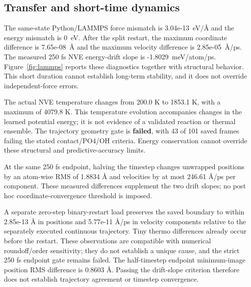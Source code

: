 \subsection{Transfer and short-time dynamics}

The same-state Python/LAMMPS force mismatch is 3.04e-13~eV/\AA{} and the energy mismatch is 0~eV. After the split restart, the maximum coordinate difference is 7.65e-08~\AA{} and the maximum velocity difference is 2.85e-05~\AA{}/ps. The measured 250 fs NVE energy-drift slope is -1.8029~meV/atom/ps. Figure~\ref{fig:lammps} reports these diagnostics together with structural behavior. This short duration cannot establish long-term stability, and it does not override independent-force errors.

The actual NVE temperature changes from 200.0 K to 1853.1 K, with a maximum of 4079.8 K. This temperature evolution accompanies changes in the learned potential energy; it is not evidence of a validated reaction or thermal ensemble. The trajectory geometry gate is \textbf{failed}, with 43 of 101 saved frames failing the stated contact/PO4/OH criteria. Energy conservation cannot override these structural and predictive-accuracy limits.

At the same 250 fs endpoint, halving the timestep changes unwrapped positions by an atom-wise RMS of 1.8834 \AA{} and velocities by at most 246.61 \AA/ps per component. These measured differences supplement the two drift slopes; no post hoc coordinate-convergence threshold is imposed.

A separate zero-step binary-restart load preserves the saved boundary to within 2.85e-13 \AA{} in positions and 5.77e-11 \AA/ps in velocity components relative to the separately executed continuous trajectory. Tiny thermo differences already occur before the restart. These observations are compatible with numerical roundoff/order sensitivity; they do not establish a unique cause, and the strict 250 fs endpoint gate remains failed. The half-timestep endpoint minimum-image position RMS difference is 0.8603 \AA. Passing the drift-slope criterion therefore does not establish trajectory agreement or timestep convergence.

